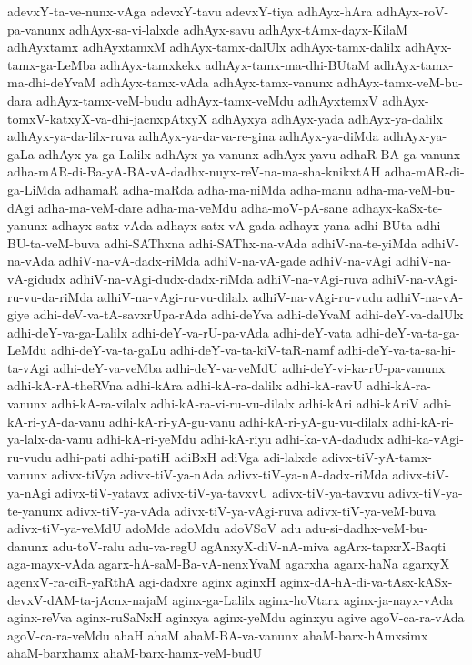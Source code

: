 {adevxY-ta-ve-nunx-vAga
adevxY-tavu
adevxY-tiya
adhAyx-hAra
adhAyx-roV-pa-vanunx
adhAyx-sa-vi-lalxde
adhAyx-savu
adhAyx-tAmx-dayx-KilaM
adhAyxtamx
adhAyxtamxM
adhAyx-tamx-dalUlx
adhAyx-tamx-dalilx
adhAyx-tamx-ga-LeMba
adhAyx-tamxkekx
adhAyx-tamx-ma-dhi-BUtaM
adhAyx-tamx-ma-dhi-deYvaM
adhAyx-tamx-vAda
adhAyx-tamx-vanunx
adhAyx-tamx-veM-bu-dara
adhAyx-tamx-veM-budu
adhAyx-tamx-veMdu
adhAyxtemxV
adhAyx-tomxV-katxyX-va-dhi-jacnxpAtxyX
adhAyxya
adhAyx-yada
adhAyx-ya-dalilx
adhAyx-ya-da-lilx-ruva
adhAyx-ya-da-va-re-gina
adhAyx-ya-diMda
adhAyx-ya-gaLa
adhAyx-ya-ga-Lalilx
adhAyx-ya-vanunx
adhAyx-yavu
adhaR-BA-ga-vanunx
adha-mAR-di-Ba-yA-BA-vA-dadhx-nuyx-reV-na-ma-sha-knikxtAH
adha-mAR-di-ga-LiMda
adhamaR
adha-maRda
adha-ma-niMda
adha-manu
adha-ma-veM-bu-dAgi
adha-ma-veM-dare
adha-ma-veMdu
adha-moV-pA-sane
adhayx-kaSx-te-yanunx
adhayx-satx-vAda
adhayx-satx-vA-gada
adhayx-yana
adhi-BUta
adhi-BU-ta-veM-buva
adhi-SAThxna
adhi-SAThx-na-vAda
adhiV-na-te-yiMda
adhiV-na-vAda
adhiV-na-vA-dadx-riMda
adhiV-na-vA-gade
adhiV-na-vAgi
adhiV-na-vA-gidudx
adhiV-na-vAgi-dudx-dadx-riMda
adhiV-na-vAgi-ruva
adhiV-na-vAgi-ru-vu-da-riMda
adhiV-na-vAgi-ru-vu-dilalx
adhiV-na-vAgi-ru-vudu
adhiV-na-vA-giye
adhi-deV-va-tA-savxrUpa-rAda
adhi-deYva
adhi-deYvaM
adhi-deY-va-dalUlx
adhi-deY-va-ga-Lalilx
adhi-deY-va-rU-pa-vAda
adhi-deY-vata
adhi-deY-va-ta-ga-LeMdu
adhi-deY-va-ta-gaLu
adhi-deY-va-ta-kiV-taR-namf
adhi-deY-va-ta-sa-hi-ta-vAgi
adhi-deY-va-veMba
adhi-deY-va-veMdU
adhi-deY-vi-ka-rU-pa-vanunx
adhi-kA-rA-theRVna
adhi-kAra
adhi-kA-ra-dalilx
adhi-kA-ravU
adhi-kA-ra-vanunx
adhi-kA-ra-vilalx
adhi-kA-ra-vi-ru-vu-dilalx
adhi-kAri
adhi-kAriV
adhi-kA-ri-yA-da-vanu
adhi-kA-ri-yA-gu-vanu
adhi-kA-ri-yA-gu-vu-dilalx
adhi-kA-ri-ya-lalx-da-vanu
adhi-kA-ri-yeMdu
adhi-kA-riyu
adhi-ka-vA-dadudx
adhi-ka-vAgi-ru-vudu
adhi-pati
adhi-patiH
adiBxH
adiVga
adi-lalxde
adivx-tiV-yA-tamx-vanunx
adivx-tiVya
adivx-tiV-ya-nAda
adivx-tiV-ya-nA-dadx-riMda
adivx-tiV-ya-nAgi
adivx-tiV-yatavx
adivx-tiV-ya-tavxvU
adivx-tiV-ya-tavxvu
adivx-tiV-ya-te-yanunx
adivx-tiV-ya-vAda
adivx-tiV-ya-vAgi-ruva
adivx-tiV-ya-veM-buva
adivx-tiV-ya-veMdU
adoMde
adoMdu
adoVSoV
adu
adu-si-dadhx-veM-bu-danunx
adu-toV-ralu
adu-va-regU
agAnxyX-diV-nA-miva
agArx-tapxrX-Baqti
aga-mayx-vAda
agarx-hA-saM-Ba-vA-nenxYvaM
agarxha
agarx-haNa
agarxyX
agenxV-ra-ciR-yaRthA
agi-dadxre
aginx
aginxH
aginx-dA-hA-di-va-tAsx-kASx-devxV-dAM-ta-jAcnx-najaM
aginx-ga-Lalilx
aginx-hoVtarx
aginx-ja-nayx-vAda
aginx-reVva
aginx-ruSaNxH
aginxya
aginx-yeMdu
aginxyu
agive
agoV-ca-ra-vAda
agoV-ca-ra-veMdu
ahaH
ahaM
ahaM-BA-va-vanunx
ahaM-barx-hAmxsimx
ahaM-barxhamx
ahaM-barx-hamx-veM-budU
}
